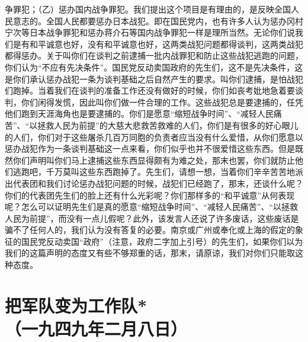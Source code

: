 \documentclass[cn,11pt,chinese]{elegantbook}
\def\myformat#1{\hfil\hfil #1}
\begin{document}
争罪犯；（乙）惩办国内战争罪犯。我们提出这个项目是有理由的，是反映全国人民意志的。全国人民都要惩办日本战犯。即在国民党内，也有许多人认为惩办冈村宁次等日本战争罪犯和惩办蒋介石等国内战争罪犯一样是理所当然。无论你们说我们是有和平诚意也好，没有和平诚意也好，这两类战犯问题都得谈判，这两类战犯都得惩办。关于叫你们在谈判之前逮捕一批内战罪犯和防止这些战犯逃跑的问题，你们认为“不应有先决条件”。国民党反动卖国政府的先生们，这不是先决条件，这是你们承认惩办战犯一条为谈判基础之后自然产生的要求。叫你们逮捕，是怕战犯们跑掉。当着我们在谈判的准备工作还没有做好的时候，你们如丧考妣地急着要谈判，你们闲得发慌，因此叫你们做一件合理的工作。这些战犯总是要逮捕的，任凭他们跑到天涯海角也是要逮捕的。你们是愿意“缩短战争时间”、“减轻人民痛苦”、“以拯救人民为前提”的大慈大悲救苦救难的人们，你们是有很多的好心眼儿的人们，你们对于这些屠杀几百万同胞的负责者应当没有什么爱惜，从你们愿意以惩办战犯作为一条谈判基础这一点来看，你们似乎也并不很爱惜这些东西。但是既然你们声明叫你们马上逮捕这些东西显得颇有为难之处，那末也罢，你们就防止他们逃跑吧，千万莫叫这些东西跑掉了。先生们，请想一想，当着你们辛辛苦苦地派出代表团和我们讨论惩办战犯问题的时候，战犯们已经跑了，那末，还谈什么呢？你们的代表团先生们的脸上还有什么光彩呢？你们那样多的“和平诚意”从何表现呢？怎么可以证明先生们是真的愿意“缩短战争时间”、“减轻人民痛苦”、“以拯救人民为前提”，而没有一点儿假呢？此外，该发言人还说了许多废话，这些废话是骗不了任何人的，我们认为没有答复的必要。南京或广州或奉化或上海的假定的象征的国民党反动卖国“政府”（注意，政府二字加上引号）的先生们，如果你们以为我们的这篇声明的态度又有些不够郑重的话，那末，请原谅，我们对你们只能取这种态度。\\
\newpage\section*{\myformat{把军队变为工作队*}\\\myformat{（一九四九年二月八日）}}
\end{document}
